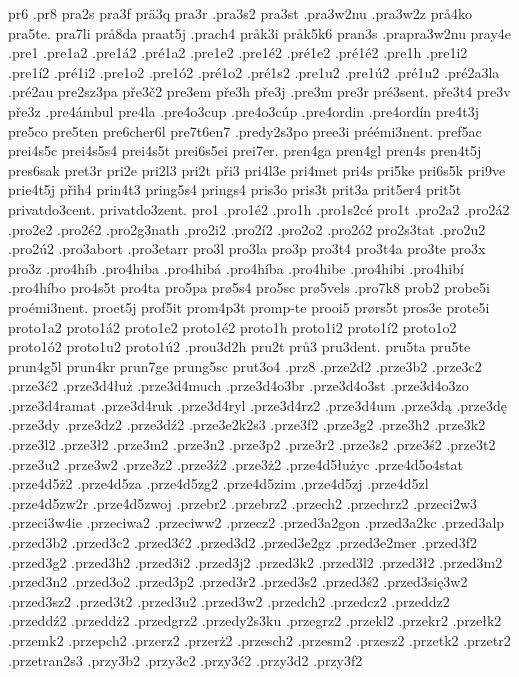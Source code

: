 {{pr6
.pr8
pra2s
pra3f
prä3q
pra3r
.pra3s2
pra3st
.pra3w2nu
.pra3w2z
prå4ko
pra5te.
pra7li
prå8da
praat5j
.prach4
pråk3i
pråk5k6
pran3s
.prapra3w2nu
pray4e
.pre1
.pre1a2
.pre1á2
.pré1a2
.pre1e2
.pre1é2
.pré1e2
.pré1é2
.pre1h
.pre1i2
.pre1í2
.pré1i2
.pre1o2
.pre1ó2
.pré1o2
.pré1s2
.pre1u2
.pre1ú2
.pré1u2
.pré2a3la
.pré2au
pre2sz3pa
pře3č2
pre3em
pře3h
pře3j
.pre3m
pre3r
pré3sent.
pře3t4
pre3v
pře3z
.pre4ámbul
pre4la
.pre4o3cup
.pre4o3cúp
.pre4ordin
.pre4ordín
pre4t3j
pre5co
pre5ten
pre6cher6l
pre7t6en7
.predy2s3po
pree3i
préémi3nent.
pref5ac
prei4s5c
prei4s5s4
prei4s5t
prei6s5ei
prei7er.
pren4ga
pren4gl
pren4s
pren4t5j
pres6sak
pret3r
pri2e
pri2l3
pri2t
při3
pri4l3e
pri4met
pri4s
pri5ke
pri6s5k
pri9ve
prie4t5j
přih4
prin4t3
pring5s4
prings4
pris3o
pris3t
prit3a
prit5er4
prit5t
privatdo3cent.
privatdo3zent.
pro1
.pro1é2
.pro1h
.pro1s2cé
pro1t
.pro2a2
.pro2á2
.pro2e2
.pro2é2
.pro2g3nath
.pro2i2
.pro2í2
.pro2o2
.pro2ó2
pro2s3tat
.pro2u2
.pro2ú2
.pro3abort
.pro3etarr
pro3l
pro3la
pro3p
pro3t4
pro3t4a
pro3te
pro3x
pro3z
.pro4híb
.pro4hiba
.pro4hibá
.pro4híba
.pro4hibe
.pro4hibi
.pro4hibí
.pro4híbo
pro4s5t
pro4ta
pro5pa
prø5s4
pro5sc
prø5vels
.pro7k8
prob2
probe5i
proémi3nent.
proet5j
prof5it
prom4p3t
promp-te
prooi5
prørs5t
pros3e
prote5i
proto1a2
proto1á2
proto1e2
proto1é2
proto1h
proto1i2
proto1í2
proto1o2
proto1ó2
proto1u2
proto1ú2
.prou3d2h
pru2t
prů3
pru3dent.
pru5ta
pru5te
prun4g5l
prun4kr
prun7ge
prung5sc
prut3o4
.prz8
.prze2d2
.prze3b2
.prze3c2
.prze3ć2
.prze3d4łuż
.prze3d4much
.prze3d4o3br
.prze3d4o3st
.prze3d4o3zo
.prze3d4ramat
.prze3d4ruk
.prze3d4ryl
.prze3d4rz2
.prze3d4um
.prze3dą
.prze3dę
.prze3dy
.prze3dz2
.prze3dź2
.prze3e2k2s3
.prze3f2
.prze3g2
.prze3h2
.prze3k2
.prze3l2
.prze3ł2
.prze3m2
.prze3n2
.prze3p2
.prze3r2
.prze3s2
.prze3ś2
.prze3t2
.prze3u2
.prze3w2
.prze3z2
.prze3ź2
.prze3ż2
.prze4d5łużyc
.prze4d5o4stat
.prze4d5ż2
.prze4d5za
.prze4d5zg2
.prze4d5zim
.prze4d5zj
.prze4d5zl
.prze4d5zw2r
.prze4d5zwoj
.przebr2
.przebrz2
.przech2
.przechrz2
.przeci2w3
.przeci3w4ie
.przeciwa2
.przeciww2
.przecz2
.przed3a2gon
.przed3a2kc
.przed3alp
.przed3b2
.przed3c2
.przed3ć2
.przed3d2
.przed3e2gz
.przed3e2mer
.przed3f2
.przed3g2
.przed3h2
.przed3i2
.przed3j2
.przed3k2
.przed3l2
.przed3ł2
.przed3m2
.przed3n2
.przed3o2
.przed3p2
.przed3r2
.przed3s2
.przed3ś2
.przed3się3w2
.przed3sz2
.przed3t2
.przed3u2
.przed3w2
.przedch2
.przedcz2
.przeddz2
.przeddź2
.przeddż2
.przedgrz2
.przedy2s3ku
.przegrz2
.przekl2
.przekr2
.przełk2
.przemk2
.przepch2
.przerz2
.przerż2
.przesch2
.przesm2
.przesz2
.przetk2
.przetr2
.przetran2s3
.przy3b2
.przy3c2
.przy3ć2
.przy3d2
.przy3f2
}}
